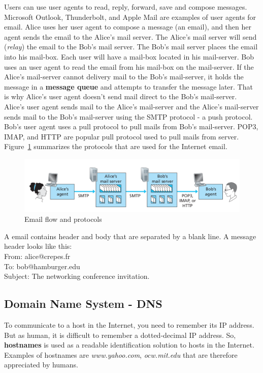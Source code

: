 \documentclass[a4paper, 11pt]{article}
\begin{document}
Users can use user agents to read, reply, forward, save and compose messages. Microsoft Outlook, Thunderbolt, and Apple Mail are examples of user agents for email. Alice uses her user agent to compose a message (an email), and then her agent sends the email to the Alice's mail server. The Alice's mail server will send (\textit{relay}) the email to the Bob's mail server. The Bob's mail server places the email into his mail-box. Each user will have a mail-box located in his mail-server. Bob uses an user agent to read the email from his mail-box on the mail-server. If the Alice's mail-server cannot delivery mail to the Bob's mail-server, it holds the message in a \textbf{message queue} and attempts to transfer the message later. That is why Alice's user agent doesn't send mail direct to the Bob's mail-server.\\

Alice's user agent sends mail to the Alice's mail-server and the Alice's mail-server sends mail to the Bob's mail-server using the SMTP protocol - a push protocol. Bob's user agent uses a pull protocol to pull mails from Bob's mail-server. POP3, IMAP, and HTTP are popular pull protocol used to pull mails from server. Figure~\ref{fig:email-protocol} summarizes the protocols that are used for the Internet email.\\

\begin{figure}[h]
\includegraphics[scale=0.6]{email-protocol.png}
\caption{Email flow and protocols}
\label{fig:email-protocol}
\end{figure}

A email contains header and body that are separated by a blank line. A message header looks like this:\\
{\ttfamily
From: alice@crepes.fr\\
To: bob@hamburger.edu\\
Subject: The networking conference invitation.}\\

\subsection{Domain Name System - DNS}
To communicate to a host in the Internet, you need to remember its IP address. But as human, it is difficult to remember a dotted-decimal IP address. So, \textbf{hostnames} is used as a readable identification solution to hosts in the Internet. Examples of hostnames are \textit{www.yahoo.com}, \textit{ocw.mit.edu} that are therefore appreciated by humans.\\
\end{document}
